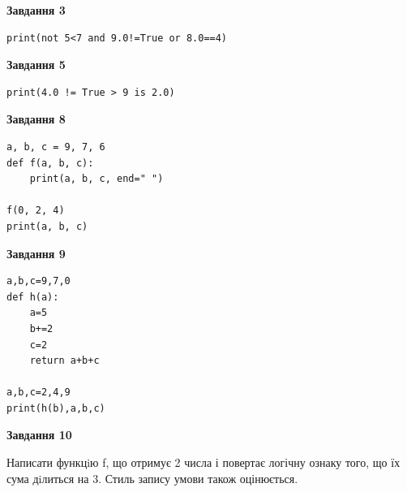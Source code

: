 \documentclass[12pt, ukrainian]{article}
\begin{document}
{\begin {large}
\begin{minipage}[t]{7.5cm}
\end{minipage}
\vline \hspace{6mm}
\begin{minipage}[t]{10.5cm}

\begin{center}
\textbf{Завдання 3}
\end{center}

\begin{verbatim}
print(not 5<7 and 9.0!=True or 8.0==4)
\end{verbatim}



\begin{center}
\textbf{Завдання 5}
\end{center}

\begin{verbatim}
print(4.0 != True > 9 is 2.0)
\end{verbatim}



\begin{center}
\textbf{Завдання 8}
\end{center}

\begin{verbatim}
a, b, c = 9, 7, 6
def f(a, b, c):
    print(a, b, c, end=" ")

f(0, 2, 4)
print(a, b, c)
\end{verbatim}



\begin{center}
\textbf{Завдання 9}
\end{center}

\begin{verbatim}
a,b,c=9,7,0
def h(a):
    a=5
    b+=2
    c=2
    return a+b+c

a,b,c=2,4,9
print(h(b),a,b,c)
\end{verbatim}



\begin{center}
\textbf{Завдання 10}
\end{center}

Написати функцiю f, що отримує 2 числа і повертає логічну ознаку того, що їх сума дiлиться на 3. Стиль запису умови також оцінюється.\par

\end{minipage}

\end {large}}
\newpage
\end{document}
